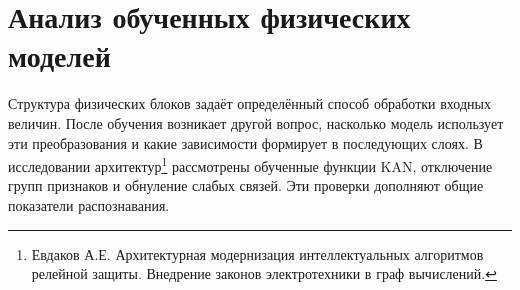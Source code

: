 \section{Анализ обученных физических моделей}
\label{sec:ch4_physical_validation}

Структура физических блоков задаёт определённый способ
обработки входных величин. После обучения возникает другой
вопрос, насколько модель использует эти преобразования
и какие зависимости формирует в последующих слоях.
В исследовании архитектур\footnote{Евдаков А.Е.
Архитектурная модернизация интеллектуальных алгоритмов
релейной защиты. Внедрение законов электротехники
в граф вычислений.} рассмотрены обученные функции KAN,
отключение групп признаков и обнуление слабых связей.
Эти проверки дополняют общие показатели распознавания.


